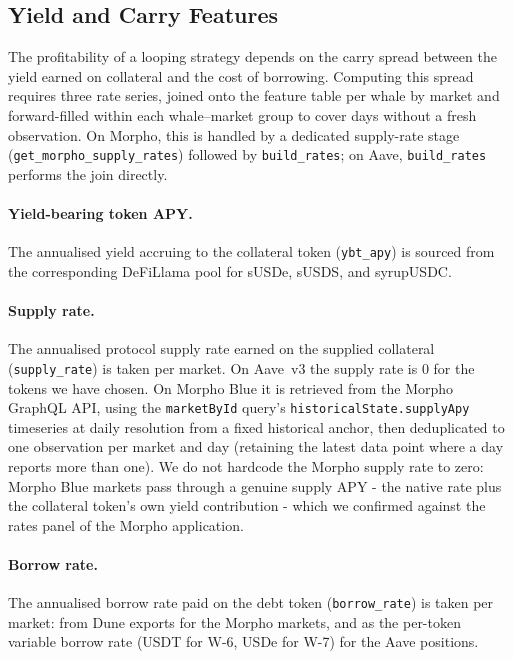 \subsection{Yield and Carry Features}
\label{sec:carry-features}

The profitability of a looping strategy depends on the carry spread
between the yield earned on collateral and the cost of borrowing.
Computing this spread requires three rate series, joined onto the
feature table per whale by market and forward-filled within each
whale--market group to cover days without a fresh observation. On
Morpho, this is handled by a dedicated supply-rate stage
(\texttt{get\_morpho\_supply\_rates}) followed by \texttt{build\_rates};
on Aave, \texttt{build\_rates} performs the join directly.

\paragraph{Yield-bearing token APY.}
The annualised yield accruing to the collateral token (\texttt{ybt\_apy})
is sourced from the corresponding DeFiLlama pool for sUSDe, sUSDS, and
syrupUSDC.

\paragraph{Supply rate.}
The annualised protocol supply rate earned on the supplied collateral
(\texttt{supply\_rate}) is taken per market. On Aave~v3 the supply rate is 0 for the tokens we have chosen. On Morpho Blue
it is retrieved from the Morpho GraphQL API, using the
\texttt{marketById} query's \texttt{historicalState.supplyApy}
timeseries at daily resolution from a fixed historical anchor, then
deduplicated to one observation per market and day (retaining the latest
data point where a day reports more than one). We do not hardcode the
Morpho supply rate to zero: Morpho Blue markets pass through a genuine
supply APY - the native rate plus the collateral token's own yield
contribution - which we confirmed against the rates panel of the Morpho
application.

\paragraph{Borrow rate.}
The annualised borrow rate paid on the debt token (\texttt{borrow\_rate})
is taken per market: from Dune exports for the Morpho markets, and as the
per-token variable borrow rate (USDT for W-6, USDe for W-7) for the Aave
positions.


